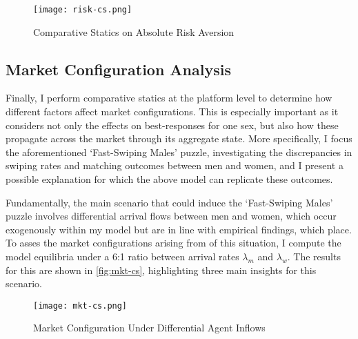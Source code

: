 \begin{figure}[ht]
    \centering
    \caption{Comparative Statics on Absolute Risk Aversion}
    \texttt{[image: risk-cs.png]}
    \label{fig:risk-cs} 
\end{figure}

\subsection{Market Configuration Analysis}\label{sec:section3.3} 
Finally, I perform comparative statics at the platform level to determine how different factors affect market configurations. This is especially important as it considers not only the effects on best-responses for one sex, but also how these propagate across the market through its aggregate state. More specifically, I focus the aforementioned `Fast-Swiping Males' puzzle, investigating the discrepancies in swiping rates and matching outcomes between men and women, and I present a possible explanation for which the above model can replicate these outcomes. 

Fundamentally, the main scenario that could induce the `Fast-Swiping Males' puzzle involves differential arrival flows between men and women, which occur exogenously within my model but are in line with empirical findings, which place. To asses the market configurations arising from of this situation, I compute the model equilibria under a 6:1 ratio between arrival rates $\lambda_m$ and $\lambda_w$. The results for this are shown in \autoref{fig:mkt-cs}, highlighting three main insights for this scenario. 

\begin{figure}[ht]
    \centering
    \caption{Market Configuration Under Differential Agent Inflows}
    \texttt{[image: mkt-cs.png]}
    \label{fig:mkt-cs} 
\end{figure} 

